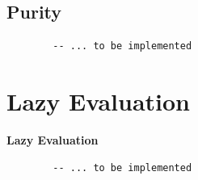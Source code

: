 \documentclass[unknownkeysallowed]{beamer}
\begin{document}
  \subsection{Purity}
  \begin{frame}[fragile]

  \begin{verbatim}
        -- ... to be implemented
  \end{verbatim}
\end{frame}

  
\section{Lazy Evaluation}
\begin{frame}

    \begin{center}
    \Large\textbf{Lazy Evaluation}
    \end{center}

\end{frame}


  \begin{frame}[fragile]

  \begin{verbatim}
        -- ... to be implemented
  \end{verbatim}
\end{frame}
  
\end{document}

